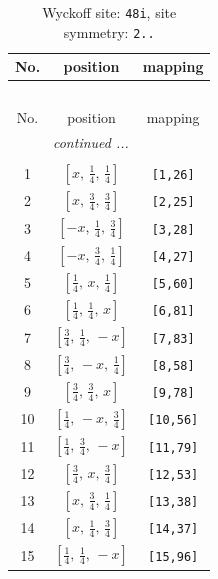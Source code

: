 \documentclass[fleqn,8pt]{jsarticle}
\begin{document}
\begin{longtable}{ccc}
\caption{Wyckoff site: {\tt 48i}, site symmetry: {\tt 2..}}
 \\
 \hline \hline
No. & position & mapping \\ \hline \endfirsthead

\multicolumn{2}{l}{\tablename\ \thetable{}} \\
 \hline \hline
No. & position & mapping \\ \hline \endhead

 \hline \hline
\multicolumn{2}{r}{\footnotesize\it continued ...} \\ \endfoot

 \hline \hline
\multicolumn{2}{r}{} \\ \endlastfoot

1 & $\left[ x,\, \frac{1}{4},\, \frac{1}{4} \right]$ & {\tt [1,26]} \\ \hline
2 & $\left[ x,\, \frac{3}{4},\, \frac{3}{4} \right]$ & {\tt [2,25]} \\ \hline
3 & $\left[ - x,\, \frac{1}{4},\, \frac{3}{4} \right]$ & {\tt [3,28]} \\ \hline
4 & $\left[ - x,\, \frac{3}{4},\, \frac{1}{4} \right]$ & {\tt [4,27]} \\ \hline
5 & $\left[ \frac{1}{4},\, x,\, \frac{1}{4} \right]$ & {\tt [5,60]} \\ \hline
6 & $\left[ \frac{1}{4},\, \frac{1}{4},\, x \right]$ & {\tt [6,81]} \\ \hline
7 & $\left[ \frac{3}{4},\, \frac{1}{4},\, - x \right]$ & {\tt [7,83]} \\ \hline
8 & $\left[ \frac{3}{4},\, - x,\, \frac{1}{4} \right]$ & {\tt [8,58]} \\ \hline
9 & $\left[ \frac{3}{4},\, \frac{3}{4},\, x \right]$ & {\tt [9,78]} \\ \hline
10 & $\left[ \frac{1}{4},\, - x,\, \frac{3}{4} \right]$ & {\tt [10,56]} \\ \hline
11 & $\left[ \frac{1}{4},\, \frac{3}{4},\, - x \right]$ & {\tt [11,79]} \\ \hline
12 & $\left[ \frac{3}{4},\, x,\, \frac{3}{4} \right]$ & {\tt [12,53]} \\ \hline
13 & $\left[ x,\, \frac{3}{4},\, \frac{1}{4} \right]$ & {\tt [13,38]} \\ \hline
14 & $\left[ x,\, \frac{1}{4},\, \frac{3}{4} \right]$ & {\tt [14,37]} \\ \hline
15 & $\left[ \frac{1}{4},\, \frac{1}{4},\, - x \right]$ & {\tt [15,96]} \\ \hline

\end{longtable}
\end{document}

